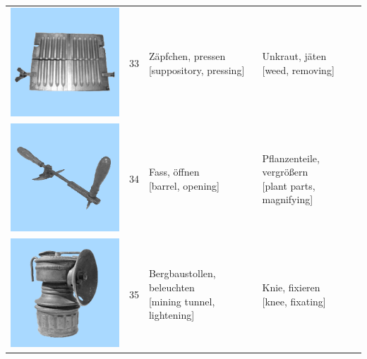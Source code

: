 \documentclass[
  english,
  doc,12pt,twoside,floatsintext]{apa7}
\begin{document}
\begin{center}
\begin{ThreePartTable}
{\begin{longtable}{llll}
\includegraphics[valign=c, scale=0.23]{../materials/unfamiliar/33.png} & 33 & \makecell[l]{Zäpfchen, pressen\\{[suppository, pressing]}} & \makecell[l]{Unkraut, jäten\\{[weed, removing]}}\\
\includegraphics[valign=c, scale=0.23]{../materials/unfamiliar/34.png} & 34 & \makecell[l]{Fass, öffnen\\{[barrel, opening]}} & \makecell[l]{Pflanzenteile, vergrößern\\{[plant parts, magnifying]}}\\
\includegraphics[valign=c, scale=0.23]{../materials/unfamiliar/35.png} & 35 & \makecell[l]{Bergbaustollen, beleuchten\\{[mining tunnel, lightening]}} & \makecell[l]{Knie, fixieren\\{[knee, fixating]}}\\

\end{longtable}}
\end{ThreePartTable}
\end{center}
\end{document}
